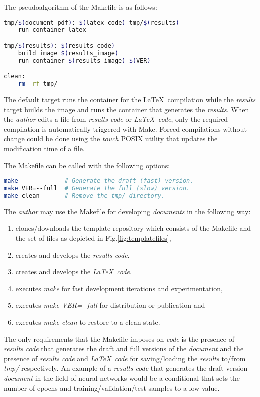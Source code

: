\documentclass[journal]{IEEEtran}
\begin{document}
The pseudoalgorithm of the Makefile is as follows:
\begin{lstlisting}[language=bash, style=lststyle, caption={Pseudoalgorithm of the Makefile.}]
tmp/$(document_pdf): $(latex_code) tmp/$(results)
	run container latex

tmp/$(results): $(results_code)
	build image $(results_image)
	run container $(results_image) $(VER)

clean:
	rm -rf tmp/
\end{lstlisting}

The default target runs the container for the \LaTeX\ compilation while the \textit{results} target builds the image and runs the container that generates the \textit{results}.
When the \textit{author} edits a file from \textit{results code} or \textit{\LaTeX\ code}, only the required compilation is automatically triggered with Make.
Forced compilations without change could be done using the \textit{touch} POSIX utility that updates the modification time of a file.

The Makefile can be called with the following options:
\begin{lstlisting}[language=bash, style=lststyle, caption={Makefile options.}]
make             # Generate the draft (fast) version.
make VER=--full  # Generate the full (slow) version.
make clean       # Remove the tmp/ directory.
\end{lstlisting}

The \textit{author} may use the Makefile for developing \textit{documents} in the following way:
\begin{enumerate}
	\item clones/downloads the template repository which consists of the Makefile and the set of files as depicted in Fig.\ref{fig:templatefiles},
	\item creates and develops the \textit{results code}.
	\item creates and develops the \textit{\LaTeX\ code}.
	\item executes \textit{make} for fast development iterations and experimentation,
	\item executes \textit{make VER=-{}-full} for distribution or publication and
	\item executes \textit{make clean} to restore to a clean state.
\end{enumerate}

The only requirements that the Makefile imposes on \textit{code} is the presence of \textit{results code} that generates the draft and full versions of the \textit{document} and the presence of \textit{results code} and \textit{\LaTeX\ code} for saving/loading the \textit{results} to/from \textit{tmp/} respectively.
An example of a \textit{results code} that generates the draft version \textit{document} in the field of neural networks would be a conditional that sets the number of epochs and training/validation/test samples to a low value.
\end{document}

